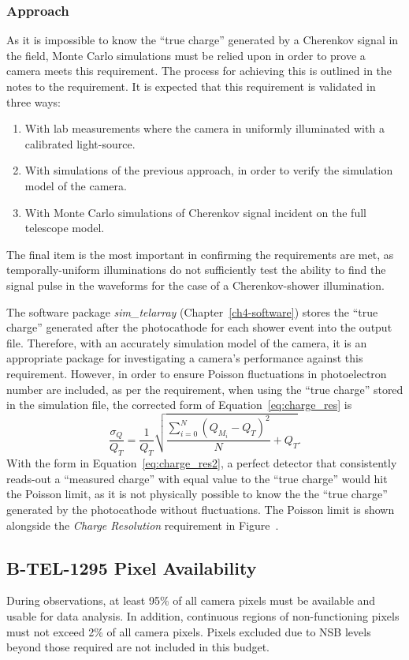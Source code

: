 \subsubsection{Approach}
As it is impossible to know the ``true charge'' generated by a Cherenkov signal in the field, Monte Carlo simulations must be relied upon in order to prove a camera meets this requirement. The process for achieving this is outlined in the notes to the requirement. It is expected that this requirement is validated in three ways:
\begin{enumerate}
\item With lab measurements where the camera in uniformly illuminated with a calibrated light-source.
\item With simulations of the previous approach, in order to verify the simulation model of the camera.
\item With Monte Carlo simulations of Cherenkov signal incident on the full telescope model.
\end{enumerate}
The final item is the most important in confirming the requirements are met, as temporally-uniform illuminations do not sufficiently test the ability to find the signal pulse in the waveforms for the case of a Cherenkov-shower illumination. 

The software package \textit{sim\_telarray} (Chapter~\ref{ch4-software}) stores the ``true charge'' generated after the photocathode for each shower event into the output file. Therefore, with an accurately simulation model of the camera, it is an appropriate package for investigating a camera's performance against this requirement. However, in order to ensure Poisson fluctuations in photoelectron number are included, as per the requirement, when using the ``true charge'' stored in the simulation file, the corrected form of Equation~\ref{eq:charge_res} is
\begin{equation} \label{eq:charge_res2}
\dfrac{\sigma_Q}{Q_T} = \dfrac{1}{Q_T} \sqrt{\dfrac{\sum_{i=0}^N (Q_{M_i} - Q_T)^2}{N} + Q_T}.
\end{equation}
With the form in Equation~\ref{eq:charge_res2}, a perfect detector that consistently reads-out a ``measured charge'' with equal value to the ``true charge'' would hit the Poisson limit, as it is not physically possible to know the the ``true charge'' generated by the photocathode without fluctuations. The Poisson limit is shown alongside the \textit{Charge Resolution} requirement in Figure~.
\newline
\begin{requirement}{\subsection{B-TEL-1295 Pixel Availability}}
During observations, at least 95\% of all camera pixels must be available and usable for data analysis. In addition, continuous regions of non-functioning pixels must not exceed 2\% of all camera pixels. Pixels excluded due to NSB levels beyond those required are not included in this budget.
\end{requirement}

